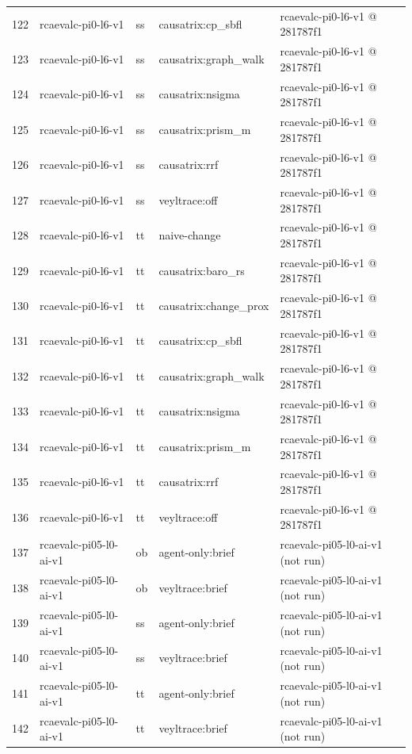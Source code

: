 \begin{longtable}{@{}r>{\raggedright\arraybackslash}p{87.0pt}>{\raggedright\arraybackslash}p{18.0pt}>{\raggedright\arraybackslash}p{63.0pt}>{\raggedright\arraybackslash}p{108.0pt}@{}}
122 & rcaevalc-pi0-l6-v1 & ss & causatrix:cp\_sbfl & rcaevalc-pi0-l6-v1 @ 281787f1 \\
123 & rcaevalc-pi0-l6-v1 & ss & causatrix:graph\_walk & rcaevalc-pi0-l6-v1 @ 281787f1 \\
124 & rcaevalc-pi0-l6-v1 & ss & causatrix:nsigma & rcaevalc-pi0-l6-v1 @ 281787f1 \\
125 & rcaevalc-pi0-l6-v1 & ss & causatrix:prism\_m & rcaevalc-pi0-l6-v1 @ 281787f1 \\
126 & rcaevalc-pi0-l6-v1 & ss & causatrix:rrf & rcaevalc-pi0-l6-v1 @ 281787f1 \\
127 & rcaevalc-pi0-l6-v1 & ss & veyltrace:off & rcaevalc-pi0-l6-v1 @ 281787f1 \\
128 & rcaevalc-pi0-l6-v1 & tt & naive-change & rcaevalc-pi0-l6-v1 @ 281787f1 \\
129 & rcaevalc-pi0-l6-v1 & tt & causatrix:baro\_rs & rcaevalc-pi0-l6-v1 @ 281787f1 \\
130 & rcaevalc-pi0-l6-v1 & tt & causatrix:change\_prox & rcaevalc-pi0-l6-v1 @ 281787f1 \\
131 & rcaevalc-pi0-l6-v1 & tt & causatrix:cp\_sbfl & rcaevalc-pi0-l6-v1 @ 281787f1 \\
132 & rcaevalc-pi0-l6-v1 & tt & causatrix:graph\_walk & rcaevalc-pi0-l6-v1 @ 281787f1 \\
133 & rcaevalc-pi0-l6-v1 & tt & causatrix:nsigma & rcaevalc-pi0-l6-v1 @ 281787f1 \\
134 & rcaevalc-pi0-l6-v1 & tt & causatrix:prism\_m & rcaevalc-pi0-l6-v1 @ 281787f1 \\
135 & rcaevalc-pi0-l6-v1 & tt & causatrix:rrf & rcaevalc-pi0-l6-v1 @ 281787f1 \\
136 & rcaevalc-pi0-l6-v1 & tt & veyltrace:off & rcaevalc-pi0-l6-v1 @ 281787f1 \\
137 & rcaevalc-pi05-l0-ai-v1 & ob & agent-only:brief & rcaevalc-pi05-l0-ai-v1 (not run) \\
138 & rcaevalc-pi05-l0-ai-v1 & ob & veyltrace:brief & rcaevalc-pi05-l0-ai-v1 (not run) \\
139 & rcaevalc-pi05-l0-ai-v1 & ss & agent-only:brief & rcaevalc-pi05-l0-ai-v1 (not run) \\
140 & rcaevalc-pi05-l0-ai-v1 & ss & veyltrace:brief & rcaevalc-pi05-l0-ai-v1 (not run) \\
141 & rcaevalc-pi05-l0-ai-v1 & tt & agent-only:brief & rcaevalc-pi05-l0-ai-v1 (not run) \\
142 & rcaevalc-pi05-l0-ai-v1 & tt & veyltrace:brief & rcaevalc-pi05-l0-ai-v1 (not run) \\

\end{longtable}
